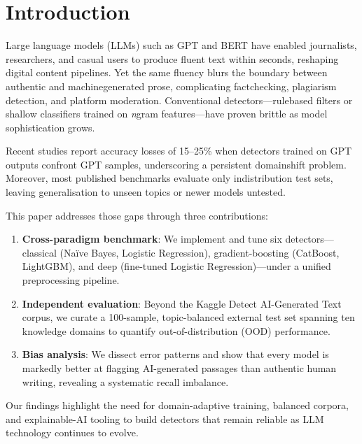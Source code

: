 
\section{Introduction}  %

Large language models (LLMs) \cite{alberts2023large} such as GPT and BERT have enabled journalists, researchers, and casual users to produce fluent text within seconds, reshaping digital content pipelines. Yet the same fluency blurs the boundary between authentic and machine\textendash generated prose, complicating fact\textendash checking, plagiarism detection, and platform moderation. Conventional detectors---rule\textendash based filters or shallow classifiers trained on \emph{n}\textendash gram features---have proven brittle as model sophistication grows.

Recent studies report accuracy losses of 15--25\% when detectors trained on GPT outputs confront GPT samples, underscoring a persistent domain\textendash shift problem. Moreover, most published benchmarks evaluate only in\textendash distribution test sets, leaving generalisation to unseen topics or newer models untested.

This paper addresses those gaps through three contributions:

\begin{enumerate}  %
    \item \textbf{Cross-paradigm benchmark}: We implement and tune six detectors---classical (Naïve Bayes, Logistic Regression), gradient-boosting (CatBoost, LightGBM), and deep (fine-tuned Logistic Regression)---under a unified preprocessing pipeline.
    \item \textbf{Independent evaluation}: Beyond the Kaggle Detect AI-Generated Text corpus, we curate a 100-sample, topic-balanced external test set spanning ten knowledge domains to quantify out-of-distribution (OOD) performance.
    \item \textbf{Bias analysis}: We dissect error patterns and show that every model is markedly better at flagging AI-generated passages than authentic human writing, revealing a systematic recall imbalance.
\end{enumerate}

Our findings highlight the need for domain-adaptive training, balanced corpora, and explainable-AI tooling to build detectors that remain reliable as LLM technology continues to evolve.
